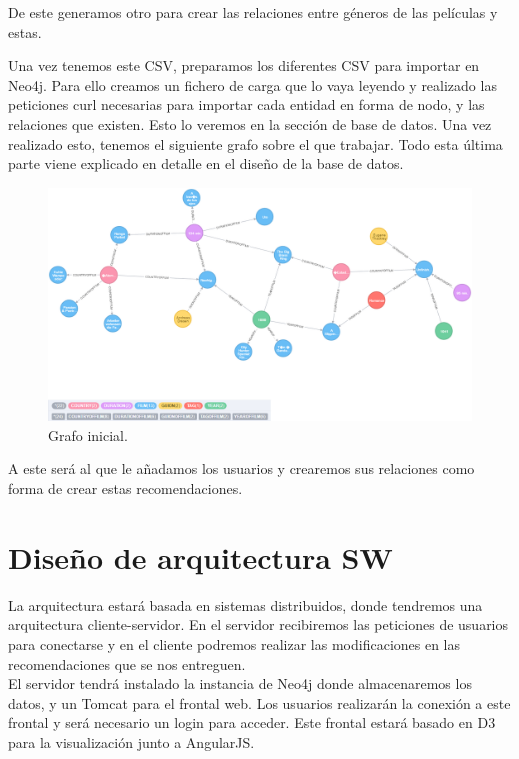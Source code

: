 \documentclass[12pt,a4paper]{article}
\begin{document}
		De este generamos otro para crear las relaciones entre géneros de las películas y estas.
	
		Una vez tenemos este CSV, preparamos los diferentes CSV para importar en Neo4j. Para ello creamos un fichero de carga que lo vaya leyendo y realizado las peticiones curl necesarias para importar cada entidad en forma de nodo, y las relaciones que existen.
		Esto lo veremos en la sección de base de datos.
		\clearpage
		Una vez realizado esto, tenemos el siguiente grafo sobre el que trabajar. Todo esta última parte viene explicado en detalle en el diseño de la base de datos.

		\begin{figure}[tbph!]
			\centering
			\includegraphics[width=1\linewidth]{images/Grafo_Peliculas.png}
			\caption{Grafo inicial.}
			\label{fig:GrafoInicial}
		\end{figure}
		
		A este será al que le añadamos los usuarios y crearemos sus relaciones como forma de crear estas recomendaciones.
		\clearpage
		\section{Diseño de arquitectura SW}
		
		La arquitectura estará basada en sistemas distribuidos, donde tendremos una arquitectura cliente-servidor. En el servidor recibiremos las peticiones de usuarios para conectarse y en el cliente podremos realizar las modificaciones en las recomendaciones que se nos entreguen.\\
		
		El servidor tendrá instalado la instancia de Neo4j donde almacenaremos los datos, y un Tomcat para el frontal web. Los usuarios realizarán la conexión a este frontal y será necesario un login para acceder. 
		Este frontal estará basado en D3 para la visualización junto a AngularJS.\\
		
\end{document}
